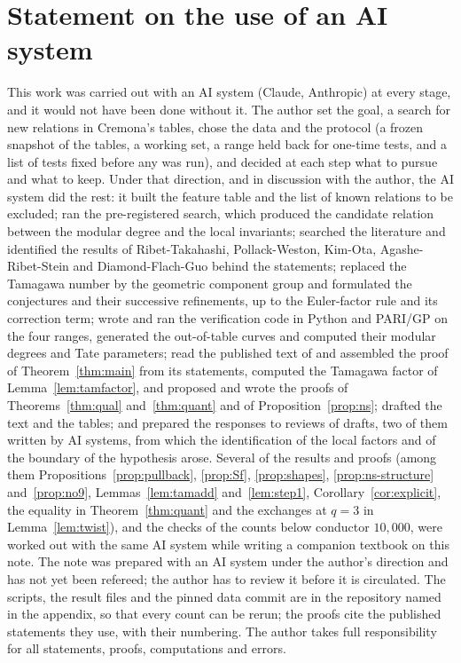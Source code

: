 \documentclass[11pt]{amsart}
\theoremstyle{definition}
\begin{document}
\section*{Statement on the use of an AI system}
This work was carried out with an AI system (Claude, Anthropic) at every stage, and it would not have been done without it. The author set the goal, a search for new relations in Cremona's tables, chose the data and the protocol (a frozen snapshot of the tables, a working set, a range held back for one-time tests, and a list of tests fixed before any was run), and decided at each step what to pursue and what to keep. Under that direction, and in discussion with the author, the AI system did the rest: it built the feature table and the list of known relations to be excluded; ran the pre-registered search, which produced the candidate relation between the modular degree and the local invariants; searched the literature and identified the results of Ribet-Takahashi, Pollack-Weston, Kim-Ota, Agashe-Ribet-Stein and Diamond-Flach-Guo behind the statements; replaced the Tamagawa number by the geometric component group and formulated the conjectures and their successive refinements, up to the Euler-factor rule and its correction term; wrote and ran the verification code in Python and PARI/GP on the four ranges, generated the out-of-table curves and computed their modular degrees and Tate parameters; read the published text of \cite{DFG04} and assembled the proof of Theorem~\ref{thm:main} from its statements, computed the Tamagawa factor of Lemma~\ref{lem:tamfactor}, and proposed and wrote the proofs of Theorems~\ref{thm:qual} and~\ref{thm:quant} and of Proposition~\ref{prop:ns}; drafted the text and the tables; and prepared the responses to reviews of drafts, two of them written by AI systems, from which the identification of the local factors and of the boundary of the hypothesis arose. Several of the results and proofs (among them Propositions~\ref{prop:pullback}, \ref{prop:Sf}, \ref{prop:shapes}, \ref{prop:ns-structure} and~\ref{prop:no9}, Lemmas~\ref{lem:tamadd} and~\ref{lem:step1}, Corollary~\ref{cor:explicit}, the equality in Theorem~\ref{thm:quant} and the exchanges at $q=3$ in Lemma~\ref{lem:twist}), and the checks of the counts below conductor $10{,}000$, were worked out with the same AI system while writing a companion textbook on this note. The note was prepared with an AI system under the author's direction and has not yet been refereed; the author has to review it before it is circulated. The scripts, the result files and the pinned data commit are in the repository named in the appendix, so that every count can be rerun; the proofs cite the published statements they use, with their numbering. The author takes full responsibility for all statements, proofs, computations and errors.



\end{document}
